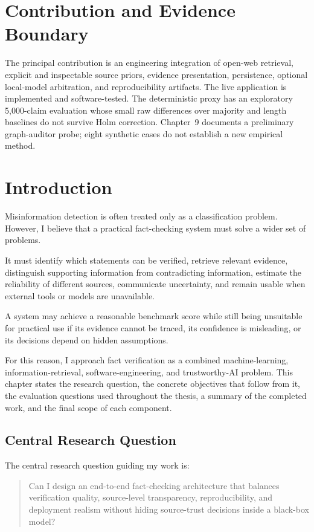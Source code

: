 \documentclass[12pt,a4paper,openany]{report}
\begin{document}
\chapter*{Contribution and Evidence Boundary}
The principal contribution is an engineering integration of open-web retrieval, explicit and inspectable source priors, evidence presentation, persistence, optional local-model arbitration, and reproducibility artifacts. The live application is implemented and software-tested. The deterministic proxy has an exploratory 5{,}000-claim evaluation whose small raw differences over majority and length baselines do not survive Holm correction. Chapter~9 documents a preliminary graph-auditor probe; eight synthetic cases do not establish a new empirical method.

\tableofcontents
\listoftables
\listoffigures
\clearpage
{}

\chapter{Introduction}
Misinformation detection is often treated only as a classification problem. However, I believe that a practical fact-checking system must solve a wider set of problems.

It must identify which statements can be verified, retrieve relevant evidence, distinguish supporting information from contradicting information, estimate the reliability of different sources, communicate uncertainty, and remain usable when external tools or models are unavailable.

A system may achieve a reasonable benchmark score while still being unsuitable for practical use if its evidence cannot be traced, its confidence is misleading, or its decisions depend on hidden assumptions.

For this reason, I approach fact verification as a combined machine-learning, information-retrieval, software-engineering, and trustworthy-AI problem. This chapter states the research question, the concrete objectives that follow from it, the evaluation questions used throughout the thesis, a summary of the completed work, and the final scope of each component.

\section{Central Research Question}
The central research question guiding my work is:
\begin{quote}
Can I design an end-to-end fact-checking architecture that balances verification quality, source-level transparency, reproducibility, and deployment realism without hiding source-trust decisions inside a black-box model?
\end{quote}
\end{document}
